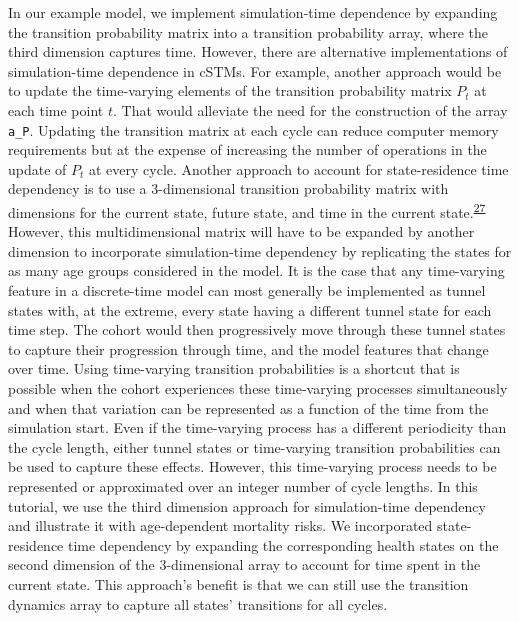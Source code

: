 \documentclass[
]{article}
\begin{document}
In our example model, we implement simulation-time dependence by expanding the transition probability matrix into a transition probability array, where the third dimension captures time. However, there are alternative implementations of simulation-time dependence in cSTMs. For example, another approach would be to update the time-varying elements of the transition probability matrix \(P_t\) at each time point \(t\). That would alleviate the need for the construction of the array \texttt{a\_P}. Updating the transition matrix at each cycle can reduce computer memory requirements but at the expense of increasing the number of operations in the update of \(P_t\) at every cycle. Another approach to account for state-residence time dependency is to use a 3-dimensional transition probability matrix with dimensions for the current state, future state, and time in the current state.\textsuperscript{\protect\hyperlink{ref-Hawkins2005}{27}} However, this multidimensional matrix will have to be expanded by another dimension to incorporate simulation-time dependency by replicating the states for as many age groups considered in the model. It is the case that any time-varying feature in a discrete-time model can most generally be implemented as tunnel states with, at the extreme, every state having a different tunnel state for each time step. The cohort would then progressively move through these tunnel states to capture their progression through time, and the model features that change over time. Using time-varying transition probabilities is a shortcut that is possible when the cohort experiences these time-varying processes simultaneously and when that variation can be represented as a function of the time from the simulation start. Even if the time-varying process has a different periodicity than the cycle length, either tunnel states or time-varying transition probabilities can be used to capture these effects. However, this time-varying process needs to be represented or approximated over an integer number of cycle lengths. In this tutorial, we use the third dimension approach for simulation-time dependency and illustrate it with age-dependent mortality risks. We incorporated state-residence time dependency by expanding the corresponding health states on the second dimension of the 3-dimensional array to account for time spent in the current state. This approach's benefit is that we can still use the transition dynamics array to capture all states' transitions for all cycles.
\end{document}

